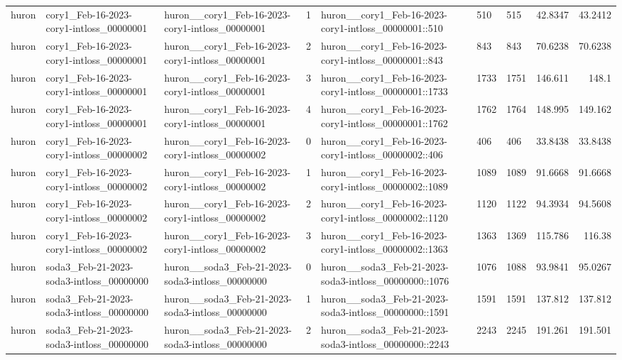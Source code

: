 \begin{longtable}{lllrlllrr}
huron & cory1\_Feb-16-2023-cory1-intloss\_00000001 & huron\_\_cory1\_Feb-16-2023-cory1-intloss\_00000001 & 1 & huron\_\_cory1\_Feb-16-2023-cory1-intloss\_00000001::510 & 510 & 515 & 42.8347 & 43.2412 \\
huron & cory1\_Feb-16-2023-cory1-intloss\_00000001 & huron\_\_cory1\_Feb-16-2023-cory1-intloss\_00000001 & 2 & huron\_\_cory1\_Feb-16-2023-cory1-intloss\_00000001::843 & 843 & 843 & 70.6238 & 70.6238 \\
huron & cory1\_Feb-16-2023-cory1-intloss\_00000001 & huron\_\_cory1\_Feb-16-2023-cory1-intloss\_00000001 & 3 & huron\_\_cory1\_Feb-16-2023-cory1-intloss\_00000001::1733 & 1733 & 1751 & 146.611 & 148.1 \\
huron & cory1\_Feb-16-2023-cory1-intloss\_00000001 & huron\_\_cory1\_Feb-16-2023-cory1-intloss\_00000001 & 4 & huron\_\_cory1\_Feb-16-2023-cory1-intloss\_00000001::1762 & 1762 & 1764 & 148.995 & 149.162 \\
huron & cory1\_Feb-16-2023-cory1-intloss\_00000002 & huron\_\_cory1\_Feb-16-2023-cory1-intloss\_00000002 & 0 & huron\_\_cory1\_Feb-16-2023-cory1-intloss\_00000002::406 & 406 & 406 & 33.8438 & 33.8438 \\
huron & cory1\_Feb-16-2023-cory1-intloss\_00000002 & huron\_\_cory1\_Feb-16-2023-cory1-intloss\_00000002 & 1 & huron\_\_cory1\_Feb-16-2023-cory1-intloss\_00000002::1089 & 1089 & 1089 & 91.6668 & 91.6668 \\
huron & cory1\_Feb-16-2023-cory1-intloss\_00000002 & huron\_\_cory1\_Feb-16-2023-cory1-intloss\_00000002 & 2 & huron\_\_cory1\_Feb-16-2023-cory1-intloss\_00000002::1120 & 1120 & 1122 & 94.3934 & 94.5608 \\
huron & cory1\_Feb-16-2023-cory1-intloss\_00000002 & huron\_\_cory1\_Feb-16-2023-cory1-intloss\_00000002 & 3 & huron\_\_cory1\_Feb-16-2023-cory1-intloss\_00000002::1363 & 1363 & 1369 & 115.786 & 116.38 \\
huron & soda3\_Feb-21-2023-soda3-intloss\_00000000 & huron\_\_soda3\_Feb-21-2023-soda3-intloss\_00000000 & 0 & huron\_\_soda3\_Feb-21-2023-soda3-intloss\_00000000::1076 & 1076 & 1088 & 93.9841 & 95.0267 \\
huron & soda3\_Feb-21-2023-soda3-intloss\_00000000 & huron\_\_soda3\_Feb-21-2023-soda3-intloss\_00000000 & 1 & huron\_\_soda3\_Feb-21-2023-soda3-intloss\_00000000::1591 & 1591 & 1591 & 137.812 & 137.812 \\
huron & soda3\_Feb-21-2023-soda3-intloss\_00000000 & huron\_\_soda3\_Feb-21-2023-soda3-intloss\_00000000 & 2 & huron\_\_soda3\_Feb-21-2023-soda3-intloss\_00000000::2243 & 2243 & 2245 & 191.261 & 191.501 \\

\end{longtable}
